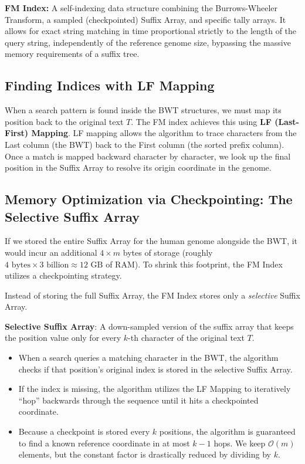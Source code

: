 \begin{important}
    \textbf{FM Index:} A self-indexing data structure combining the Burrows-Wheeler Transform, a sampled (checkpointed) Suffix Array, and specific tally arrays. It allows for exact string matching in time proportional strictly to the length of the query string, independently of the reference genome size, bypassing the massive memory requirements of a suffix tree.
\end{important}

\subsection{Finding Indices with LF Mapping}
When a search pattern is found inside the BWT structures, we must map its position back to the original text \( T \). The FM index achieves this using \textbf{LF (Last-First) Mapping}. LF mapping allows the algorithm to trace characters from the Last column (the BWT) back to the First column (the sorted prefix column). 
Once a match is mapped backward character by character, we look up the final position in the Suffix Array to resolve its origin coordinate in the genome.

\subsection{Memory Optimization via Checkpointing: The Selective Suffix Array}
If we stored the entire Suffix Array for the human genome alongside the BWT, it would incur an additional \( 4 \times m \) bytes of storage (roughly \( 4 \text{ bytes} \times 3 \text{ billion} \approx 12 \text{ GB} \) of RAM). To shrink this footprint, the FM Index utilizes a checkpointing strategy.

Instead of storing the full Suffix Array, the FM Index stores only a \textit{selective} Suffix Array.

\begin{important}
  \textbf{Selective Suffix Array}: A down-sampled version of the suffix array that keeps the position value only for every \( k \)-th character of the original text \( T \).
\end{important}

\begin{itemize}
    \item When a search queries a matching character in the BWT, the algorithm checks if that position's original index is stored in the selective Suffix Array.
    \item If the index is missing, the algorithm utilizes the LF Mapping to iteratively ``hop'' backwards through the sequence until it hits a checkpointed coordinate.
    \item Because a checkpoint is stored every \( k \) positions, the algorithm is guaranteed to find a known reference coordinate in at most \( k - 1 \) hops. We keep \( \mathcal{O}(m) \) elements, but the constant factor is drastically reduced by dividing by \( k \).
\end{itemize}

